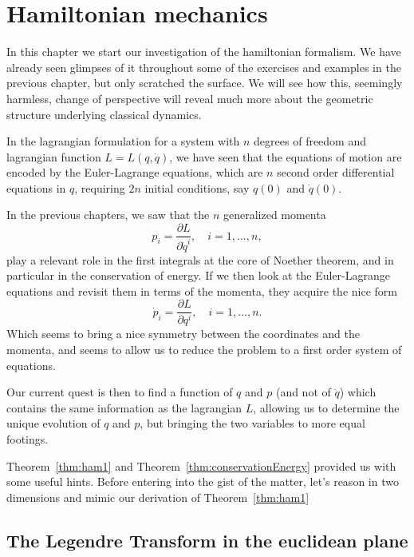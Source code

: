 \documentclass[english,fontsize=11pt,paper=a5,oneside]{scrbook}
\theoremstyle{definition}
\begin{document}
\chapter{Hamiltonian mechanics}

In this chapter we start our investigation of the hamiltonian formalism.
We have already seen glimpses of it throughout some of the exercises and examples in the previous chapter, but only scratched the surface.
We will see how this, seemingly harmless, change of perspective will reveal much more about the geometric structure underlying classical dynamics.

In the lagrangian formulation for a system with $n$ degrees of freedom and lagrangian function $L=L(q, \dot q)$, we have seen that the equations of motion are encoded by the Euler-Lagrange equations, which are $n$ second order differential equations in $q$, requiring $2n$ initial conditions, say $q(0)$ and $\dot q(0)$.

In the previous chapters, we saw that the $n$ generalized momenta
\begin{equation}
  p_i = \frac{\partial L}{\partial \dot q^i}, \quad i=1,\ldots,n,
\end{equation}
play a relevant role in the first integrals at the core of Noether theorem, and in particular in the conservation of energy.
If we then look at the Euler-Lagrange equations and revisit them in terms of the momenta, they acquire the nice form
\begin{equation}
  \dot p_i = \frac{\partial L}{\partial q^i}, \quad i=1,\ldots,n.
\end{equation}
Which seems to bring a nice symmetry between the coordinates and the momenta, and seems to allow us to reduce the problem to a first order system of equations.

Our current quest is then to find a function of $q$ and $p$ (and not of $\dot q$) which contains the same information as the lagrangian $L$, allowing us to determine the unique evolution of $q$ and $p$, but bringing the two variables to more equal footings.

Theorem~\ref{thm:ham1} and Theorem~\ref{thm:conservationEnergy} provided us with some useful hints.
Before entering into the gist of the matter, let's reason in two dimensions and mimic our derivation of Theorem~\ref{thm:ham1}

\section{The Legendre Transform in the euclidean plane}
\end{document}
